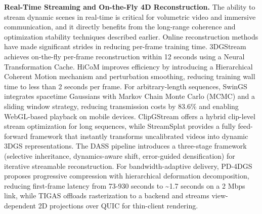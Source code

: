 \documentclass[11pt]{article}
\begin{document}
\textbf{Real-Time Streaming and On-the-Fly 4D Reconstruction.} The ability to stream dynamic scenes in real-time is critical for volumetric video and immersive communication, and it directly benefits from the long-range coherence and optimization stability techniques described earlier. Online reconstruction methods have made significant strides in reducing per-frame training time. 3DGStream \cite{ref408} achieves on-the-fly per-frame reconstruction within 12 seconds using a Neural Transformation Cache. HiCoM \cite{ref409} improves efficiency by introducing a Hierarchical Coherent Motion mechanism and perturbation smoothing, reducing training wall time to less than 2 seconds per frame. For arbitrary-length sequences, SwinGS \cite{ref410} integrates spacetime Gaussians with Markov Chain Monte Carlo (MCMC) and a sliding window strategy, reducing transmission costs by 83.6\% and enabling WebGL-based playback on mobile devices. ClipGStream \cite{ref411} offers a hybrid clip-level stream optimization for long sequences, while StreamSplat \cite{ref412} provides a fully feed-forward framework that instantly transforms uncalibrated videos into dynamic 3DGS representations. The DASS pipeline \cite{ref413} introduces a three-stage framework (selective inheritance, dynamics-aware shift, error-guided densification) for iterative streamable reconstruction. For bandwidth-adaptive delivery, PD-4DGS \cite{ref414} proposes progressive compression with hierarchical deformation decomposition, reducing first-frame latency from 73-930 seconds to \textasciitilde1.7 seconds on a 2 Mbps link, while TIGAS \cite{ref415} offloads rasterization to a backend and streams view-dependent 2D projections over QUIC for thin-client rendering.
\end{document}
